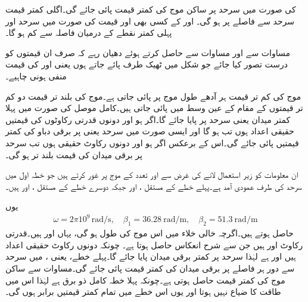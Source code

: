  کی صورت میں سرحد پر ساکن موج کی کمتر قیمت پائی جائے گی۔اگلی کمتر قیمت سرحد سے  فاصلے پر ہو گی۔ اور  کے کسی بھی اور قیمت کی صورت میں سرحد اور پہلی کمتر نقطے کے درمیان فاصلہ  سے کم ہو گا۔

مساوات  سے  اور مساوات  سے  حاصل کرتے ہوئے دھیان رہے کہ صرف ان قیمتوں کو درست تصور کیا جائے جو شکل  میں ٹھیک طرف پائے جاتے ہوں یعنی  اور   کی قیمت منفی ہونی چاہیے۔

موج کی کم تر قیمت ہر آدھے طول موج پر پائی جاتی ہے۔موج کی بلند تر قیمت دو کم تر قیمتوں کے مقام کے عین وسط میں پائی جاتی ہیں۔کامل موصل کی صورت میں پہلا کمتر میدان  یعنی سرحد پر پایا جائے گا۔اگر  ہو اور دونوں قدرتی رکاوٹوں کی قیمتیں حقیقی اعداد ہوں تب  ہو گا اور ایسی صورت میں سرحد یعنی  پر برقی دباو کی کمتر قیمتیں پائی جائے گی۔اس کے برعکس اگر  ہو اور دونوں رکاوٹ حقیقی ہوں تب سرحد پر برقی میدان کی قیمت بلند تر ہو گی۔  

ان معلومات کو زیر استعمال لانے کی غرض سے  اور  تعدد کے موج پر غور کرتے ہیں جو خطہ اول میں سرحد کی طرف عمودی آمد ہے۔پہلے خطے کے مستقل ،  اور  جبکہ دوسرے خطے کے مستقل
 ،  اور  ہیں۔

یوں 
\begin{align*}
\omega=2 \pi 10^9 \, \si{\radian \per \second}, \quad \beta_1=\SI{36.28}{\radian \per \meter}, \quad \beta_2=\SI{51.3}{\radian \per \meter}
\end{align*}
حاصل ہوتے ہیں۔اگرچہ خالی خلاء میں اس موج کی طول  ہو گی، یہاں   اور  ہیں۔قدرتی رکاوٹ  اور  ہیں جن سے شرح انعکاس  حاصل ہوتا ہے۔ چونکہ دونوں رکاوٹ حقیقی اعداد ہیں اور  ہے لہٰذا سرحد پر کمتر برقی میدان پایا جائے گا۔پہلے خطے، یعنی  ،  میں سرحد سے دور ہر  فاصلے پر برقی میدان کی کمتر قیمت پائی جائے گی۔مساوات  سے ساکن موج کی کمتر قیمت  حاصل ہوتی ہے۔چونکہ پہلا خطہ کامل ذو برق ہے لہٰذا اس میں طاقت کا ضیاع نہیں ہوتا اور یوں اس خطے میں تمام کمتر قیمتیں برابر ہوں گی۔

